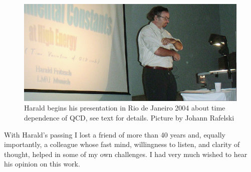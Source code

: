 \documentclass[addchapnum]{ws-rv961x669} %
\begin{document}
\begin{figure}%
\centerline{\includegraphics[width=0.99\columnwidth]{04RANPHarald1Ed.jpg}}
\caption{Harald begins his presentation in Rio de Janeiro 2004 about time dependence of QCD, see text for details. Picture by Johann Rafelski
}
\label{Fig:RANP2004} 
\end{figure}

With Harald's passing I lost a friend of more than 40 years and, equally importantly, a colleague whose fast mind, willingness to listen, and clarity of thought, helped in some of my own challenges. I had very much wished to hear his opinion on this work.




\end{document}

